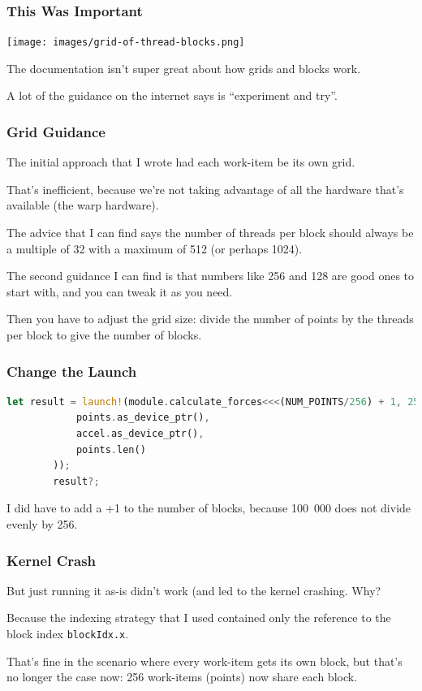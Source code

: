 \begin{frame}
\frametitle{This Was Important}

\begin{center}
	\texttt{[image: images/grid-of-thread-blocks.png]}
\end{center}

The documentation isn't super great about how grids and blocks work.

A lot of the guidance on the internet says is ``experiment and try''. 

\end{frame}


\begin{frame}
\frametitle{Grid Guidance}

 The initial approach that I wrote had each work-item be its own grid. 
 
 That's inefficient, because we're not taking advantage of all the hardware that's available (the warp hardware). 
 
 The advice that I can find says the number of threads per block should always be a multiple of 32 with a maximum of 512 (or perhaps 1024). 
 
 The second guidance I can find is that numbers like 256 and 128 are good ones to start with, and you can tweak it as you need. 
 
 Then you have to adjust the grid size: divide the number of points by the threads per block to give the number of blocks.

\end{frame}


\begin{frame}[fragile]
\frametitle{Change the Launch}

\begin{lstlisting}[language=Rust]
        let result = launch!(module.calculate_forces<<<(NUM_POINTS/256) + 1, 256, 0, stream>>>(
            points.as_device_ptr(),
            accel.as_device_ptr(),
            points.len()
        ));
        result?;
\end{lstlisting}

I did have to add a +1 to the number of blocks, because 100~000 does not divide evenly by 256.

\end{frame}


\begin{frame}
\frametitle{Kernel Crash}

 But just running it as-is didn't work (and led to the kernel crashing. Why? 
 
 Because the indexing strategy that I used contained only the reference to the block index \texttt{blockIdx.x}. 
 
 That's fine in the scenario where every work-item gets its own block, but that's no longer the case now: 256 work-items (points) now share each block.


\end{frame}


